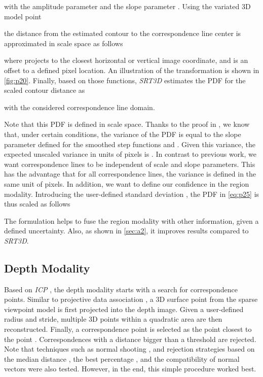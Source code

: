 \documentclass[10pt,twocolumn,letterpaper]{article}
\begin{document}
with the amplitude parameter  and the slope parameter .
Using the variated 3D model point

the distance from the estimated contour to the correspondence line center  is approximated in scale space as follows

where  projects to the closest horizontal or vertical image coordinate, and  is an offset to a defined pixel location.
An illustration of the transformation is shown in \cref{fig:p20}.
Finally, based on those functions, \textit{SRT3D} estimates the \ac{PDF} for the scaled contour distance as

with  the considered correspondence line domain.

Note that this \ac{PDF} is defined in scale space.
Thanks to the proof in \cite{Stoiber2020b}, we know that, under certain conditions, the variance of the \ac{PDF} is equal to the slope parameter  defined for the smoothed step functions  and .
Given this variance, the expected unscaled variance in units of pixels is .
In contrast to previous work, we want correspondence lines to be independent of scale and slope parameters.
This has the advantage that for all correspondence lines, the variance is defined in the same unit of pixels.
In addition, we want to define our confidence in the region modality.
Introducing the user-defined standard deviation , the \ac{PDF} in \cref{eq:p25} is thus scaled as follows

The formulation helps to fuse the region modality with other information, given a defined uncertainty.
Also, as shown in \cref{sec:a2}, it improves results compared to \textit{SRT3D}.



\subsection{Depth Modality}\label{ssec:p3}
Based on \textit{\ac{ICP}} \cite{Chen1992, Besl1992}, the depth modality starts with a search for correspondence points.
Similar to projective data association \cite{Blais1995}, a 3D surface point  from the sparse viewpoint model is first projected into the depth image.
Given a user-defined radius and stride, multiple 3D points within a quadratic area are then reconstructed.
Finally, a correspondence point  is selected as the point closest to the point .
Correspondences with a distance bigger than a threshold are rejected.
Note that techniques such as normal shooting \cite{Chen1992, Gagnon1994}, and rejection strategies based on the median distance \cite{Diebel2004}, the best percentage \cite{Pulli1999}, and the compatibility of normal vectors \cite{Zhang1994} were also tested.
However, in the end, this simple procedure worked best.
\end{document}
